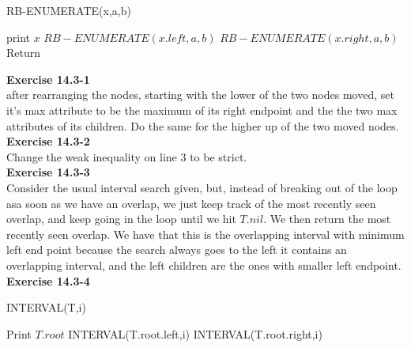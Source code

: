 \documentclass{article}
\begin{document}
\begin{algorithm}
\caption{RB-ENUMERATE(x,a,b)}
\begin{algorithmic}
	\State print $x$
\EndIf
{}
	\State $RB-ENUMERATE(x.left, a, b)$
\EndIf
{}
	\State $RB-ENUMERATE(x.right, a, b)$
\EndIf
\State Return
\end{algorithmic}
\end{algorithm}

\noindent\textbf{ Exercise 14.3-1} \\

after rearranging the nodes, starting with the lower of the two nodes moved, set it's max attribute to be the maximum of its right endpoint and the the two max attributes of its children. Do the same for the higher up of the two moved nodes.\\

\noindent\textbf{Exercise 14.3-2}\\

Change the weak inequality on line 3 to be strict. \\


\noindent\textbf{ Exercise 14.3-3} \\

Consider the usual interval search given, but, instead of breaking out of the loop asa soon as we have an overlap, we just keep track of the most recently seen overlap, and keep going in the loop until we hit $T.nil$. We then return the most recently seen overlap. We have that this is the overlapping interval with minimum left end point because the search always goes to the left it contains an overlapping interval, and the left children are the ones with smaller left endpoint.\\

\noindent\textbf{Exercise 14.3-4}\\

\begin{algorithm}
\caption{INTERVAL(T,i)}
\begin{algorithmic}
	\State Print $T.root$
\EndIf
{}
	\State INTERVAL(T.root.left,i)
\EndIf
{}
	\State INTERVAL(T.root.right,i)
\EndIf
\end{algorithmic}
\end{algorithm}
\end{document}
